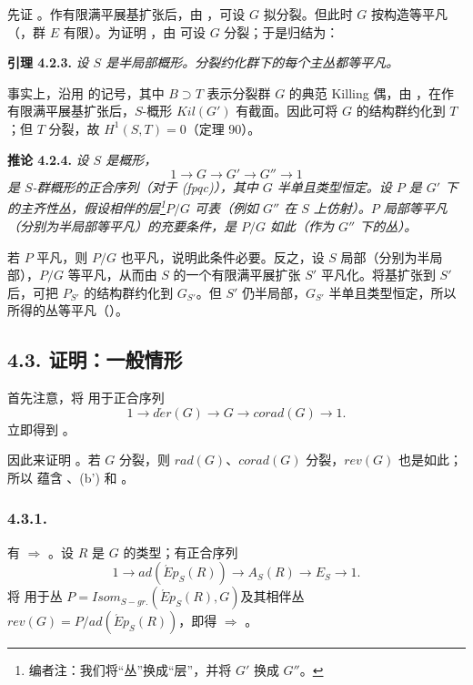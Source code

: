 先证 。作有限满平展基扩张后，由 ，可设 \(G\) 拟分裂。但此时 \(G\) 按构造等平凡（，群 \(E\) 有限）。为证明 ，由  可设 \(G\) 分裂；于是归结为：

\textbf{引理 4.2.3.} \emph{设 \(S\) 是半局部概形。分裂约化群下的每个主丛都等平凡。}

事实上，沿用  的记号，其中 \(B \supset T\) 表示分裂群 \(G\) 的典范 Killing 偶，由 ，在作有限满平展基扩张后，\(S\)-概形 \(Kil(G')\) 有截面。因此可将 \(G\) 的结构群约化到 \(T\)；但 \(T\) 分裂，故 \(H^{1}(S, T) = 0\)（定理 90）。

\textbf{推论 4.2.4.} \emph{设 \(S\) 是概形，}
\[ 1 \to G \to G' \to G'' \to 1 \]
\emph{是 \(S\)-群概形的正合序列（对于 (fpqc)），其中 \(G\) 半单且类型恒定。设 \(P\) 是 \(G'\) 下的主齐性丛，假设相伴的层\footnote{编者注：我们将“丛”换成“层”，并将 \(G'\) 换成 \(G''\)。}\(P / G\) 可表（例如 \(G''\) 在 \(S\) 上仿射）。\(P\) 局部等平凡（分别为半局部等平凡）的充要条件，是 \(P / G\) 如此（作为 \(G''\) 下的丛）。}

若 \(P\) 平凡，则 \(P / G\) 也平凡，说明此条件必要。反之，设 \(S\) 局部（分别为半局部），\(P / G\) 等平凡，从而由 \(S\) 的一个有限满平展扩张 \(S'\) 平凡化。将基扩张到 \(S'\) 后，可把 \(P_{S'}\) 的结构群约化到 \(G_{S'}\)。但 \(S'\) 仍半局部，\(G_{S'}\) 半单且类型恒定，所以所得的丛等平凡（）。

\subsection*{4.3. 证明：一般情形}
首先注意，将  用于正合序列
\[ 1 \to d\acute{e}r(G) \to G \to corad(G) \to 1. \]
立即得到 。

因此来证明 。若 \(G\) 分裂，则 \(rad(G)\)、\(corad(G)\) 分裂，\(rev(G)\) 也是如此；所以  蕴含 、(b') 和 。

\subsubsection*{4.3.1.}
有  \(\Rightarrow\) 。设 \(R\) 是 \(G\) 的类型；有正合序列
\[ 1 \to ad(\acute{E}p_{S}(R)) \to A_{S}(R) \to E_{S} \to 1. \]
将  用于丛 \(P = Isom_{S-gr.}(\acute{E}p_{S}(R), G)\)\linebreak 及其相伴丛 \(rev(G) = P /ad(\acute{E}p_{S}(R))\)，即得  \(\Rightarrow\) 。

